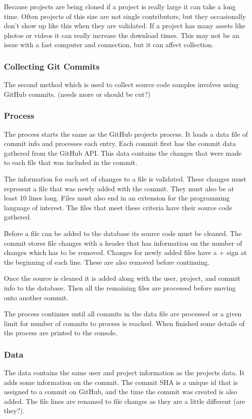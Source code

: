 \documentclass{article}
\begin{document}
Because projects are being cloned if a project is really large it can take a long time. Often projects of this size are not single contributors, but they occasionally don't show up like this when they are validated. If a project has many assets like photos or videos it can really increase the download times. This may not be an issue with a fast computer and connection, but it can affect collection.


\subsubsection{Collecting Git Commits}
The second method which is used to collect source code samples involves using GitHub commits. (needs more or should be cut?)

\subsubsection*{Process}
The process starts the same as the GitHub projects process. It loads a data file of commit info and processes each entry. Each commit first has the commit data gathered from the GitHub API. This data contains the changes that were made to each file that was included in the commit.

The information for each set of changes to a file is validated. These changes must represent a file that was newly added with the commit. They must also be at least 10 lines long. Files must also end in an extension for the programming language of interest. The files that meet these criteria have their source code gathered.

Before a file can be added to the database its source code must be cleaned. The commit stores file changes with a header that has information on the number of changes which has to be removed. Changes for newly added files have a + sign at the beginning of each line. These are also removed before continuing.

Once the source is cleaned it is added along with the user, project, and commit info to the database. Then all the remaining files are processed before moving onto another commit.

The process continues until all commits in the data file are processed or a given limit for number of commits to process is reached. When finished some details of the process are printed to the console.

\subsubsection*{Data}
The data contains the same user and project information as the projects data. It adds some information on the commit. The commit SHA is a unique id that is assigned to a commit on GitHub, and the time the commit was created is also added. The file lines are renamed to file changes as they are a little different (are they?).
\end{document}
